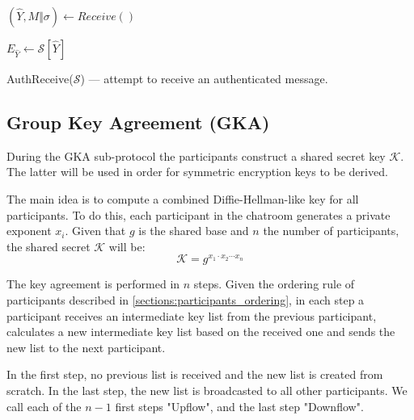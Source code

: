 \begin{algorithm}[t]
  \Begin
  {	
    $(\hat{Y}, M \Vert \sigma) \leftarrow Receive()$  
  
    $E_{\hat{Y}} \leftarrow \mathcal{S}[\hat{Y}]$
  
    {
    }  
  
  }
  \caption{AuthReceive($\mathcal{S}$) --- attempt to receive an authenticated message.}
  \label{algo:auth_receive}
\end{algorithm}

\subsection{Group Key Agreement (GKA)}
\label{subsections:gka}

During the GKA sub-protocol the participants construct a shared secret key $\mathcal{K}$. The latter will be used in order for symmetric encryption keys to be derived.

The main idea is to compute a combined Diffie-Hellman-like key for all participants. To do this, each participant in the chatroom generates a private exponent $x_i$. Given that $g$ is the shared base and $n$ the number of participants, the shared secret $\mathcal{K}$ will be: 
\[
\mathcal{K} = g^{x_1 \cdot x_2 \cdots x_n}
\]

The key agreement is performed in $n$ steps. Given the ordering rule of participants described in \ref{sections:participants_ordering}, in each step a participant receives an intermediate key list from the previous participant, calculates a new intermediate key list based on the received one and sends the new list to the next participant.

In the first step, no previous list is received and the new list is created from scratch. In the last step, the new list is broadcasted to all other participants. We call each of the $n-1$ first steps "Upflow", and the last step "Downflow".

